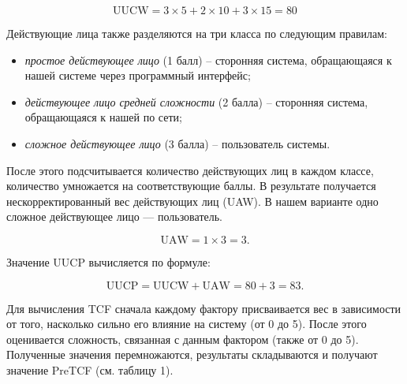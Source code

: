 \documentclass[14pt,russian]{extarticle}
\begin{document}
\begin{equation}
	\mathrm{UUCW} = 3 \times 5 + 2 \times 10 + 3 \times 15 = 80
\end{equation}

Действующие лица также разделяются на три класса по следующим правилам:

\begin{itemize}
	\item \textit{простое действующее лицо} (1 балл) – сторонняя система, обращающаяся к
		нашей системе через программный интерфейс;

	\item \textit{действующее лицо средней сложности} (2 балла) – сторонняя система,
		обращающаяся к нашей по сети;

	\item \textit{сложное действующее лицо} (3 балла) – пользователь системы.
\end{itemize}

После этого подсчитывается количество действующих лиц в каждом классе,
количество умножается на соответствующие баллы. В результате получается
нескорректированный вес действующих лиц (UAW). В нашем варианте одно сложное
действующее лицо --- пользователь.

\begin{equation}
	\mathrm{UAW} = 1 \times 3 = 3.
\end{equation}

Значение UUCP вычисляется по формуле:

\begin{equation}
	\mathrm{UUCP} = \mathrm{UUCW} + \mathrm{UAW} = 80 + 3 = 83.
\end{equation}

Для вычисления TCF сначала каждому фактору присваивается вес в зависимости от
того, насколько сильно его влияние на систему (от 0 до 5). После этого
оценивается сложность, связанная с данным фактором (также от 0 до 5). Полученные
значения перемножаются, результаты складываются и получают значение PreTCF
(см. таблицу 1).
\end{document}
